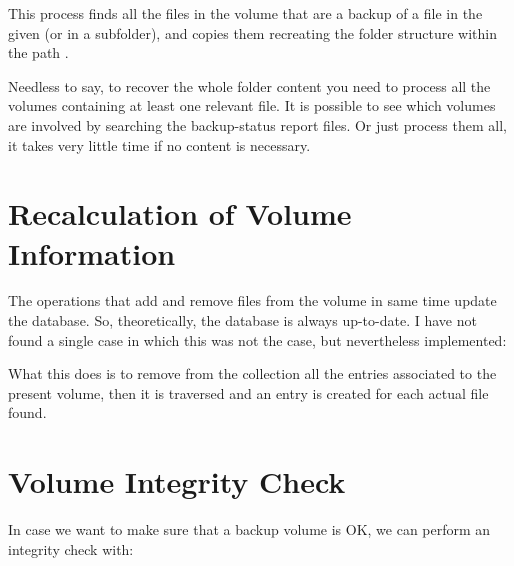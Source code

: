 \documentclass[letterpaper,10pt,english]{sphinxmanual}
\begin{document}
This process finds all the files in the volume that are a backup of a file in the given  (or in a subfolder),
and copies them recreating the folder structure within the path .

Needless to say, to recover the whole folder content you need to process all the volumes containing at least one relevant file. It is possible to see which volumes
are involved by searching the backup-status report files. Or just process them all, it takes very little time if no content is necessary.


\section{Recalculation of Volume Information}
\label{\detokenize{index:recalculation-of-volume-information}}
The operations that add and remove files from the volume in same time update the database.
So, theoretically, the database is always up-to-date. I have not found a single case in which this was not the case,
but nevertheless implemented:

\begin{sphinxVerbatim}[commandchars=\\\{\}]
   
\end{sphinxVerbatim}

What this does is to remove from the  collection all the entries associated to the present volume, then
it is traversed and an entry is created for each actual file found.


\section{Volume Integrity Check}
\label{\detokenize{index:volume-integrity-check}}
In case we want to make sure that a backup volume is OK, we can perform an integrity check with:

\begin{sphinxVerbatim}[commandchars=\\\{\}]
   
\end{sphinxVerbatim}
\end{document}
